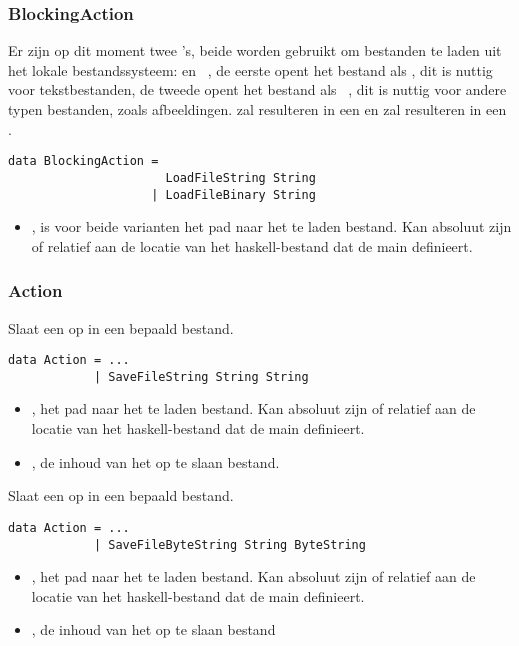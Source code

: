 \subsubsection{BlockingAction}
Er zijn op dit moment twee 's, beide worden gebruikt om bestanden te laden uit het lokale bestandssysteem:  en ~, de eerste opent het bestand als , dit is nuttig voor tekstbestanden, de tweede opent het bestand als ~, dit is nuttig voor andere typen bestanden, zoals afbeeldingen.  zal resulteren in een  en  zal resulteren in een .
\begin{lstlisting}
data BlockingAction = 
					  LoadFileString String
					| LoadFileBinary String
\end{lstlisting}
\begin{itemize}
	\item {}, is voor beide varianten het pad naar het te laden bestand. Kan absoluut zijn of relatief aan de locatie van het haskell-bestand dat de main definieert.
\end{itemize}

\subsubsection{Action}
Slaat een  op in een bepaald bestand.
\begin{lstlisting}
data Action = ...
			| SaveFileString String String
\end{lstlisting}
\begin{itemize}
	\item {}, het pad naar het te laden bestand. Kan absoluut zijn of relatief aan de locatie van het haskell-bestand dat de main definieert.
	\item {}, de inhoud van het op te slaan bestand.
\end{itemize}

Slaat een  op in een bepaald bestand.
\begin{lstlisting}
data Action = ...
			| SaveFileByteString String ByteString
\end{lstlisting}
\begin{itemize}
	\item {}, het pad naar het te laden bestand. Kan absoluut zijn of relatief aan de locatie van het haskell-bestand dat de main definieert.
	\item {}, de inhoud van het op te slaan bestand
\end{itemize}

